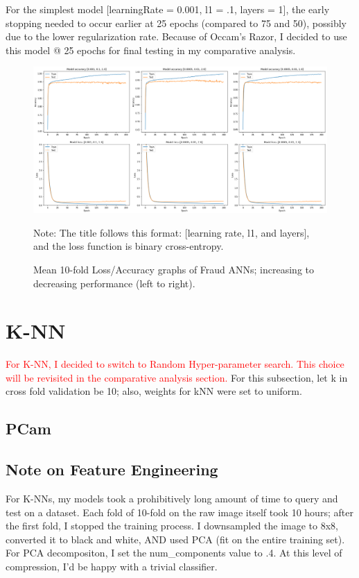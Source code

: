 \documentclass[a4paper]{article}
\begin{document}
For the simplest model [learningRate = 0.001, l1 = .1, layers = 1], the early stopping needed to occur earlier at 25 epochs (compared to 75 and 50), possibly due to the lower regularization rate. Because of Occam's Razor, I decided to use this model @ 25 epochs for final testing in my comparative analysis.
\begin{figure}
  \centering
  \includegraphics[width=1\textwidth]{images/best_nns.png}
  \caption{Mean 10-fold Loss/Accuracy graphs of Fraud ANNs; increasing to decreasing performance (left to right).}
  {Note: The title follows this format: [learning rate, l1, and layers], and the loss function is binary cross-entropy.}
\end{figure}
\section{K-NN}
\textcolor{red}{For K-NN, I decided to switch to Random Hyper-parameter search. This choice will be revisited in the comparative analysis section.}
For this subsection, let k in cross fold validation be 10; also, weights for kNN were set to uniform. 
\subsection{PCam}
\subsection{Note on Feature Engineering}
For K-NNs, my models took a prohibitively long amount of time to query and test on a dataset. Each fold of 10-fold on the raw image itself took 10 hours; after the first fold, I stopped the training process. I downsampled the image to 8x8, converted it to black and white, AND used PCA (fit on the entire training set). For PCA decompositon, I set the num\_components value to .4. At this level of compression, I'd be happy with a trivial classifier. 
\end{document}
